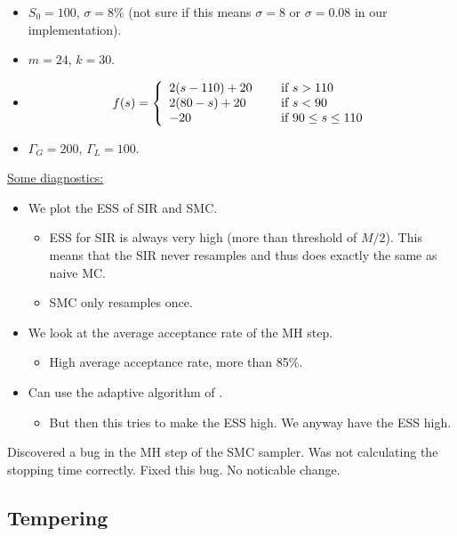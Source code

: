 \documentclass{article}
\begin{document}
\begin{itemize}

\item $S_{0} = 100$, $\sigma = 8 \%$ (not sure if this means $\sigma = 8$ or $\sigma = 0.08$ in our implementation).

\item $m = 24$, $k = 30$.

\item \[f(s) = \left\{ 
  \begin{array}{l l}
    2(s-110) + 20 & \quad \text{ if } s > 110 \\
   2(80-s) + 20 & \quad \text{ if } s < 90 \\
   -20 & \quad \text{ if } 90 \leq s \leq 110
  \end{array} \right.\]

\item $\Gamma_{G} = 200$, $\Gamma_{L} = 100$.

\end{itemize}
\vspace{0.2in}
\underline{Some diagnostics:}
\begin{itemize}
\item We plot the ESS of SIR and SMC. 
\begin{itemize}
\item ESS for SIR is always very high (more than threshold of $M/2$). This means that the SIR never resamples and thus does exactly the same as naive MC.
\item SMC only resamples once.
\end{itemize}
\item We look at the average acceptance rate of the MH step.
\begin{itemize}
\item High average acceptance rate, more than 85\%.
\end{itemize}
\item Can use the adaptive algorithm of \cite{adaptive_SMC_ABC}.
\begin{itemize}
\item But then this tries to make the ESS high. We anyway have the ESS high.
\end{itemize}
\end{itemize}

Discovered a bug in the MH step of the SMC sampler. Was not calculating the stopping time correctly. Fixed this bug. No noticable change.

\subsection{Tempering}
\end{document}
